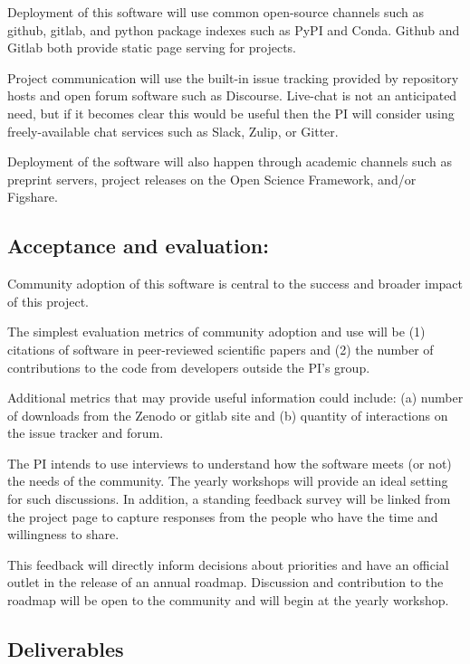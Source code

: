 Deployment of this software will use common open-source channels such as github, gitlab, and python package indexes such as PyPI and Conda.  Github and Gitlab both provide static page serving for projects.

Project communication will use the built-in issue tracking provided by repository hosts and open forum software such as Discourse.  Live-chat is not an anticipated need, but if it becomes clear this would be useful then the PI will consider using freely-available chat services such as Slack, Zulip, or Gitter.

Deployment of the software will also happen through academic channels such as preprint servers, project releases on the Open Science Framework, and/or Figshare.



\subsection{Acceptance and evaluation:}

Community adoption of this software is central to the success and broader impact of this project.

The simplest evaluation metrics of community adoption and use will be (1) citations of software in peer-reviewed scientific papers and (2) the number of contributions to the code from developers outside the PI's group.

Additional metrics that may provide useful information could include: (a) number of downloads from the Zenodo or gitlab site and (b) quantity of interactions on the issue tracker and forum.

The PI intends to use interviews to understand how the software meets (or not) the needs of the community.  The yearly workshops will provide an ideal setting for such discussions.  In addition, a standing feedback survey will be linked from the project page to capture responses from the people who have the time and willingness to share.

This feedback will directly inform decisions about priorities and have an official outlet in the release of an annual roadmap.  Discussion and contribution to the roadmap will be open to the community and will begin at the yearly workshop.


\subsection{Deliverables}

